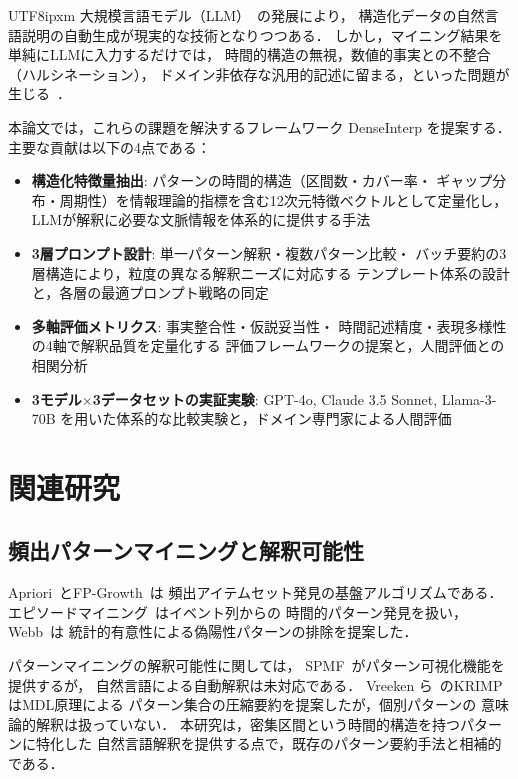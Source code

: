 \documentclass[conference]{IEEEtran}
\begin{document}
\begin{CJK}{UTF8}{ipxm}
大規模言語モデル（LLM）~\cite{brown2020gpt3, openai2023gpt4}の発展により，
構造化データの自然言語説明の自動生成が現実的な技術となりつつある．
しかし，マイニング結果を単純にLLMに入力するだけでは，
時間的構造の無視，数値的事実との不整合（ハルシネーション），
ドメイン非依存な汎用的記述に留まる，といった問題が生じる~\cite{ji2023hallucination}．

本論文では，これらの課題を解決するフレームワーク DenseInterp を提案する．
主要な貢献は以下の4点である：

\begin{itemize}[leftmargin=*]
    \item \textbf{構造化特徴量抽出}: パターンの時間的構造（区間数・カバー率・
          ギャップ分布・周期性）を情報理論的指標を含む12次元特徴ベクトルとして定量化し，
          LLMが解釈に必要な文脈情報を体系的に提供する手法
    \item \textbf{3層プロンプト設計}: 単一パターン解釈・複数パターン比較・
          バッチ要約の3層構造により，粒度の異なる解釈ニーズに対応する
          テンプレート体系の設計と，各層の最適プロンプト戦略の同定
    \item \textbf{多軸評価メトリクス}: 事実整合性・仮説妥当性・
          時間記述精度・表現多様性の4軸で解釈品質を定量化する
          評価フレームワークの提案と，人間評価との相関分析
    \item \textbf{3モデル$\times$3データセットの実証実験}: GPT-4o, Claude 3.5 Sonnet,
          Llama-3-70B を用いた体系的な比較実験と，ドメイン専門家による人間評価
\end{itemize}

\section{関連研究}
\label{sec:related}

\subsection{頻出パターンマイニングと解釈可能性}

Apriori~\cite{agrawal1994fast}とFP-Growth~\cite{han2000mining}は
頻出アイテムセット発見の基盤アルゴリズムである．
エピソードマイニング~\cite{mannila1997discovery}はイベント列からの
時間的パターン発見を扱い，Webb~\cite{webb2007discovering}は
統計的有意性による偽陽性パターンの排除を提案した．

パターンマイニングの解釈可能性に関しては，
SPMF~\cite{fournier2014spmf}がパターン可視化機能を提供するが，
自然言語による自動解釈は未対応である．
Vreeken ら~\cite{vreeken2011krimp}のKRIMP はMDL原理による
パターン集合の圧縮要約を提案したが，個別パターンの
意味論的解釈は扱っていない．
本研究は，密集区間という時間的構造を持つパターンに特化した
自然言語解釈を提供する点で，既存のパターン要約手法と相補的である．


\end{CJK}
\end{document}
